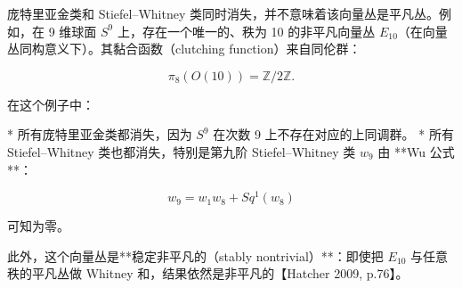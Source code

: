 庞特里亚金类和 Stiefel–Whitney 类同时消失，并不意味着该向量丛是平凡丛。例如，在 9 维球面 $S^9$ 上，存在一个唯一的、秩为 10 的非平凡向量丛 $E_{10}$（在向量丛同构意义下）。其黏合函数（clutching function）来自同伦群：

$$
\pi_8(O(10)) = \mathbb{Z}/2\mathbb{Z}.
$$

在这个例子中：

* 所有庞特里亚金类都消失，因为 $S^9$ 在次数 9 上不存在对应的上同调群。
* 所有 Stiefel–Whitney 类也都消失，特别是第九阶 Stiefel–Whitney 类 $w_9$ 由 **Wu 公式**：

  $$
  w_9 = w_1 w_8 + Sq^1(w_8)
  $$

  可知为零。

此外，这个向量丛是**稳定非平凡的（stably nontrivial）**：即使把 $E_{10}$ 与任意秩的平凡丛做 Whitney 和，结果依然是非平凡的【Hatcher 2009, p.76】。
